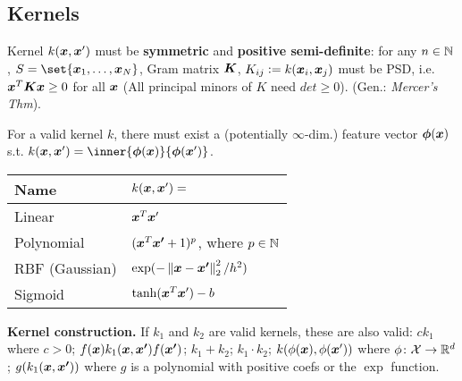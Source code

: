 \subsection*{Kernels}

    Kernel $k(\boldsymbol{x}, \boldsymbol{x}')$ must be \textbf{symmetric} and \textbf{positive semi-definite}: for any $n \in \mathbb{N}$, $S = \set{\b{x}_1, \ldots, \b{x}_N}$, Gram matrix $\boldsymbol{K}$, $K_{ij} \vcentcolon= k(\boldsymbol{x}_i, \boldsymbol{x}_j)$ must be PSD, i.e. $\boldsymbol{x}^T\boldsymbol{K}\boldsymbol{x} \geq 0$ for all $\boldsymbol{x}$ (All principal minors of $K$ need $det \geq 0$). (Gen.: \textit{Mercer's Thm}).


    For a valid kernel $k$, there must exist a (potentially $\infty$-dim.) feature vector $\boldsymbol{\phi}(\boldsymbol{x})$ s.t. $k(\b{x}, \b{x}') = \inner{\b{\phi}(\b{x})}{\b{\phi}(\b{x}')}$.
    
    \begin{tabular}{ll}
    \hline
    \textbf{Name} & $k(\boldsymbol{x}, \boldsymbol{x}') = $ \\
    \hline
    Linear & $\boldsymbol{x}^T \boldsymbol{x}'$ \\
    Polynomial & $(\boldsymbol{x}^T\boldsymbol{x'} + 1)^p$, where $p \in \mathbb{N}$ \\
    RBF (Gaussian) & $\exp(-\left\lVert\boldsymbol{x} - \boldsymbol{x'}\right\rVert_2^2 / h^2)$ \\
    Sigmoid & $\tanh(\boldsymbol{x}^T \boldsymbol{x}') - b$ 
    \\
    \hline
    \end{tabular}

    \textbf{Kernel construction.} If $k_1$ and $k_2$ are valid kernels, these are also valid:
    $ck_1$ where $c > 0$;
    $f(\boldsymbol{x}) k_1(\boldsymbol{x}, \boldsymbol{x'}) f(\boldsymbol{x'})$;
    $k_1 + k_2$; $k_1 \cdot k_2$;
    $k(\phi(\boldsymbol{x}), \phi(\boldsymbol{x}'))$ where $\phi \colon \mathcal{X} \rightarrow \mathbb R^d$;
    $g(k_1(\boldsymbol{x}, \boldsymbol{x'}))$ where $g$ is a polynomial with positive coefs or the $\exp$ function.

	

